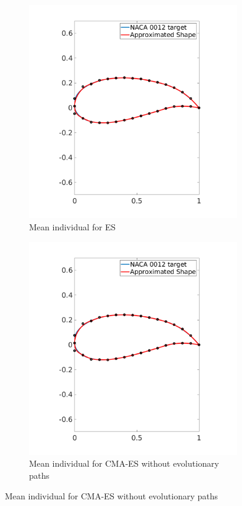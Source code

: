 \documentclass{article}
\begin{document}
\begin{itemize}
\begin{itemize}
\begin{figure}[http]
			\begin{subfigure}[b]{.50\linewidth}
				\includegraphics[scale=0.3]{img/ES_wing3_mean.png}
				\caption{Mean individual for ES}\label{fig:tiger}
			\end{subfigure}
			\hspace{2mm}
			\begin{subfigure}[b]{.45\linewidth}
				\includegraphics[scale = 0.3]{img/CMA_ES_N_wing3_mean.png}
				\caption{Mean individual for CMA-ES without evolutionary paths  \label{fig:xxx1}}
				

\end{subfigure}
\end{figure}
\end{itemize}
\end{itemize}
\end{document}
